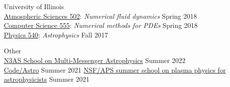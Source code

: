 \documentclass[12pt]{article}
\begin{document}
University of Illinois\\
\href{https://courses.illinois.edu/schedule/2018/spring/ATMS/502}{Atmospheric Sciences 502}: \textit{Numerical fluid dynamics} \hfill Spring 2018\\
\href{https://cs.illinois.edu/academics/courses/cs555}{Computer Science 555}: \textit{Numerical methods for PDEs} \hfill Spring 2018\\
\href{https://physics.illinois.edu/academics/courses/profile/PHYS\%20540}{Physics 540}: \textit{Astrophysics} \hfill Fall 2017

Other\\
\href{https://n3as.berkeley.edu/events/summer-school/}{N3AS School on Multi-Messenger Astrophysics} \hfill Summer 2022\\
\href{https://semaphorep.github.io/codeastro/}{Code/Astro} \hfill Summer 2021
\href{https://www.gpapschool.com/}{NSF/APS summer school on plasma physics for astrophysicists} \hfill Summer 2021
\else\fi
\end{document}
